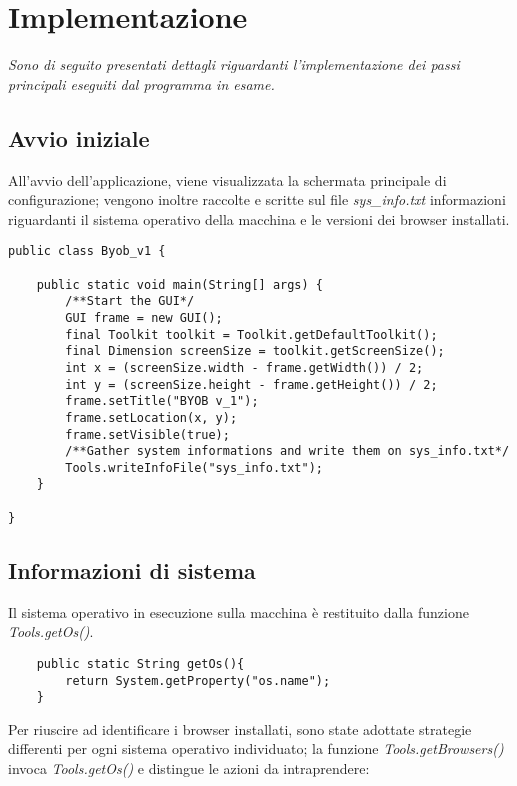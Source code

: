 \chapter{Implementazione}
\label{chap:implementazione}
\begin{minipage}{12cm}\textit{Sono di seguito presentati dettagli riguardanti l'implementazione dei passi principali eseguiti dal programma in esame. }
\end{minipage}

\vspace*{1cm}
\section{Avvio iniziale}
All'avvio dell'applicazione, viene visualizzata la schermata principale di configurazione; vengono inoltre raccolte e scritte sul file \textit{sys\_info.txt} informazioni riguardanti il sistema operativo della macchina e le versioni dei browser installati.

\vspace{0.5cm}
\begin{lstlisting}
public class Byob_v1 {

	public static void main(String[] args) {
		/**Start the GUI*/
		GUI frame = new GUI();
		final Toolkit toolkit = Toolkit.getDefaultToolkit();
		final Dimension screenSize = toolkit.getScreenSize();
		int x = (screenSize.width - frame.getWidth()) / 2;
		int y = (screenSize.height - frame.getHeight()) / 2;
		frame.setTitle("BYOB v_1");
		frame.setLocation(x, y);
		frame.setVisible(true);
		/**Gather system informations and write them on sys_info.txt*/
		Tools.writeInfoFile("sys_info.txt");
	}

}
\end{lstlisting}

\section{Informazioni di sistema}

Il sistema operativo in esecuzione sulla macchina \`{e} restituito dalla funzione \textit{Tools.getOs()}.

\vspace{0.5cm}
\begin{lstlisting}
    public static String getOs(){
	    return System.getProperty("os.name");
    }
\end{lstlisting}

Per riuscire ad identificare i browser installati, sono state adottate strategie differenti per ogni sistema operativo individuato;
la funzione \textit{Tools.getBrowsers()} invoca \textit{Tools.getOs()} e distingue le azioni da intraprendere:

